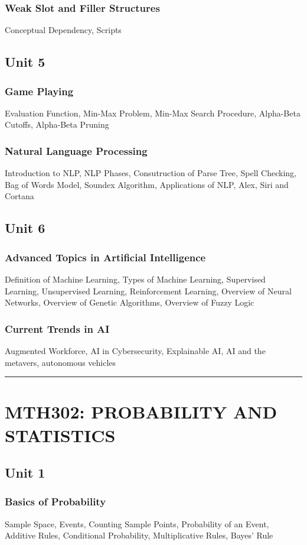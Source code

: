 \documentclass{article}
\begin{document}
\begin{multicols*}{2}
    \subsubsection*{Weak Slot and Filler Structures}
    Conceptual Dependency, Scripts
    \subsection*{Unit 5}
    \subsubsection*{Game Playing}
    Evaluation Function, Min-Max Problem, Min-Max Search Procedure, Alpha-Beta Cutoffs, Alpha-Beta Pruning
    \subsubsection*{Natural Language Processing}
    Introduction to NLP, NLP Phases, Consutruction of Parse Tree, Spell Checking, Bag of Words Model, Soundex Algorithm, Applications of NLP, Alex, Siri and Cortana
    \subsection*{Unit 6}
    \subsubsection*{Advanced Topics in Artificial Intelligence}
    Definition of Machine Learning, Types of Machine Learning, Supervised Learning, Unsupervised Learning, Reinforcement Learning, Overview of Neural Networks, Overview of Genetic Algorithms, Overview of Fuzzy Logic
    \subsubsection*{Current Trends in AI}
    Augmented Workforce, AI in Cybersecurity, Explainable AI, AI and the metavers, autonomous vehicles \\
    \hrule
    \section*{MTH302: PROBABILITY AND STATISTICS}
    \subsection*{Unit 1}
    \subsubsection*{Basics of Probability}
    Sample Space, Events, Counting Sample Points, Probability of an Event, Additive Rules, Conditional Probability, Multiplicative Rules, Bayes' Rule

\end{multicols*}
\end{document}
